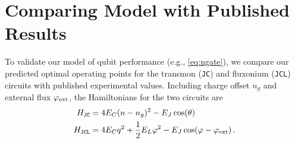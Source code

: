 \section{Comparing Model with Published Results}\label{app:sweeps}

To validate our model of qubit performance (e.g., \cref{eq:ngate}), we compare our predicted optimal operating points for the transmon (\texttt{JC}) and fluxonium (\texttt{JCL}) circuits with published experimental values. Including charge offset $n_g$ and external flux $\varphi_{\rm ext}$, the Hamiltonians for the two circuits are
\begin{align}
    \label{eq:tmon_flux_ham}
    H_{\texttt{JC}} &= 4E_C (n-n_g)^2 - E_J \cos(\theta) \\
    H_{\texttt{JCL}} &= 4E_C q^2 +\frac{1}{2}E_L \varphi^2 - E_J \cos(\varphi - \varphi_{\rm ext}) \,.
\end{align}

